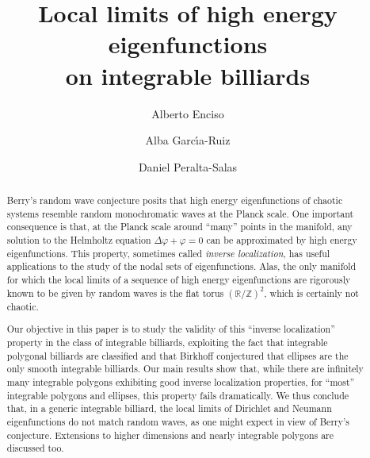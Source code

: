 \documentclass{amsart}
\theoremstyle{definition}
\theoremstyle{remark}
\def\RR{\mathbb{R}}
\def\ZZ{\mathbb{Z}}
\numberwithin{equation}{section}
\theoremstyle{definition}
\theoremstyle{remark}
\def\RR{\mathbb{R}}
\def\ZZ{\mathbb{Z}}
\begin{document}
\title[Local limits of high energy eigenfunctions on integrable billiards]{Local limits of high energy eigenfunctions\\ on integrable billiards}
 \author{Alberto Enciso}
 \address{Instituto de Ciencias Matem\'aticas, Consejo Superior de
   Investigaciones Cient\'\i ficas, 28049 Madrid, Spain}


 \author{Alba Garc\'\i a-Ruiz}
\address{Instituto de Ciencias Matem\'aticas, Consejo Superior de
   Investigaciones Cient\'\i ficas, 28049 Madrid, Spain}

 \author{Daniel Peralta-Salas}
 \address{Instituto de Ciencias Matem\'aticas, Consejo Superior de
   Investigaciones Cient\'\i ficas, 28049 Madrid, Spain}


%
%

\begin{abstract}
Berry's random wave conjecture posits that high energy eigenfunctions of cha\-otic systems resemble random monochromatic waves at the Planck scale. One important consequence is that, at the Planck scale around ``many'' points in the manifold, any solution to the Helmholtz equation $\Delta\varphi+\varphi =0$ can be approximated by high energy eigenfunctions. This property, sometimes called {\em inverse localization}\/, has useful applications to the study of the nodal sets of eigenfunctions. Alas, the only manifold for which the local limits of a sequence of high energy eigenfunctions are rigorously known to be given by random waves is the flat torus $(\RR/\ZZ)^2$, which is certainly not chaotic. %

Our objective in this paper is to study the validity of this ``inverse localization'' property in the class of integrable billiards, exploiting the fact that integrable polygonal billiards are classified and that Birkhoff conjectured that ellipses are the only smooth integrable billiards. Our main results show that, while there are infinitely many integrable polygons exhibiting good inverse localization properties, for ``most'' integrable polygons and ellipses, this property fails dramatically. We thus conclude that, in a generic integrable billiard, the local limits of Dirichlet and Neumann eigenfunctions do not match random waves, as one might expect in view of Berry's conjecture. Extensions to higher dimensions and nearly integrable polygons are discussed too.
\end{abstract}
\maketitle
\tableofcontents
\end{document}

